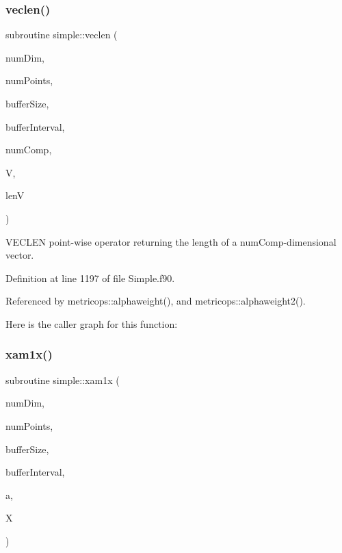 \subsubsection{\texorpdfstring{veclen()}{veclen()}}
{\footnotesize\ttfamily subroutine simple\+::veclen (\begin{DoxyParamCaption}\item[{integer(kind=4), intent(in)}]{num\+Dim,  }\item[{integer(kind=8), intent(in)}]{num\+Points,  }\item[{integer(kind=8), dimension(numdim), intent(in)}]{buffer\+Size,  }\item[{integer(kind=8), dimension(2$\ast$numdim), intent(in)}]{buffer\+Interval,  }\item[{integer(kind=4), intent(in)}]{num\+Comp,  }\item[{real(kind=8), dimension(numcomp$\ast$numpoints), intent(in)}]{V,  }\item[{real(kind=8), dimension(numpoints), intent(out)}]{lenV }\end{DoxyParamCaption})}



V\+E\+C\+L\+EN point-\/wise operator returning the length of a num\+Comp-\/dimensional vector. 



Definition at line 1197 of file Simple.\+f90.



Referenced by metricops\+::alphaweight(), and metricops\+::alphaweight2().

Here is the caller graph for this function\+:
\hypertarget{namespacesimple_a625d32a6db1fca34563d2f15d7d1ea7e}{}\label{namespacesimple_a625d32a6db1fca34563d2f15d7d1ea7e} 
\subsubsection{\texorpdfstring{xam1x()}{xam1x()}}
{\footnotesize\ttfamily subroutine simple\+::xam1x (\begin{DoxyParamCaption}\item[{integer(kind=4), intent(in)}]{num\+Dim,  }\item[{integer(kind=8), intent(in)}]{num\+Points,  }\item[{integer(kind=8), dimension(numdim), intent(in)}]{buffer\+Size,  }\item[{integer(kind=8), dimension(2$\ast$numdim), intent(in)}]{buffer\+Interval,  }\item[{real(kind=8), intent(in)}]{a,  }\item[{real(kind=8), dimension(numpoints), intent(inout)}]{X }\end{DoxyParamCaption})}



